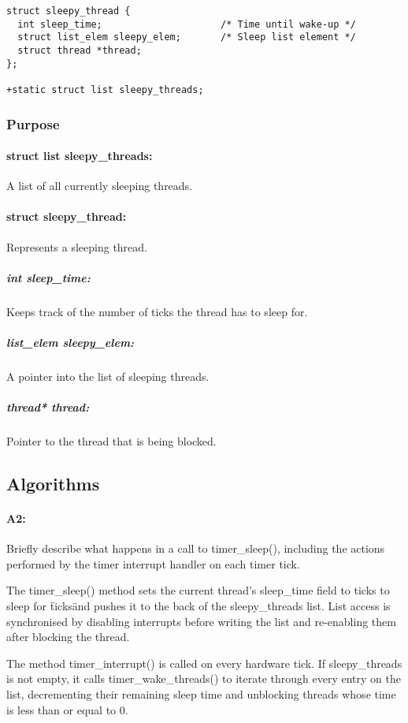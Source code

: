 \documentclass[11pt]{article}
\begin{document}
\begin{verbatim}
struct sleepy_thread {
  int sleep_time;                     /* Time until wake-up */
  struct list_elem sleepy_elem;       /* Sleep list element */
  struct thread *thread;
};

+static struct list sleepy_threads;
\end{verbatim}

\subsubsection{Purpose}
\paragraph{struct list sleepy\_threads:}
A list of all currently sleeping threads.

\paragraph{struct sleepy\_thread:}
Represents a sleeping thread.

\subparagraph{int sleep\_time:}
Keeps track of the number of ticks the thread has to sleep for.
\subparagraph{list\_elem sleepy\_elem:}
A pointer into the list of sleeping threads.
\subparagraph{thread* thread:}
Pointer to the thread that is being blocked.

\subsection{Algorithms}
\paragraph{A2:}
Briefly describe what happens in a call to timer\_sleep(), including the actions
performed by the timer interrupt handler on each timer tick.

The timer\_sleep() method sets the current thread's sleep\_time field to ticks
to sleep for \"ticks\" and pushes it to the back of the sleepy\_threads
list. List access is synchronised by disabling interrupts before writing the
list and re-enabling them after blocking the thread.

The method timer\_interrupt() is called on every hardware tick. If
sleepy\_threads is not empty, it calls timer\_wake\_threads() to iterate through
every entry on the list, decrementing their remaining sleep time and unblocking
threads whose time is less than or equal to 0.
\end{document}
